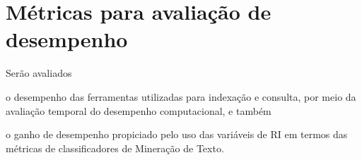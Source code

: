     
    
    
    



\section{Métricas para avaliação de desempenho}  \label{sec:Métricas-para-avaliação-de-desempenho}
    Serão avaliados
    \begin{enumerate*}[label=(\alph*)]
        \item o desempenho das ferramentas utilizadas para indexação e consulta, por meio da avaliação temporal do desempenho computacional, e também
        \item o ganho de desempenho propiciado pelo uso das variáveis de RI em termos das métricas de classificadores de Mineração de Texto. %
    \end{enumerate*} 
    
